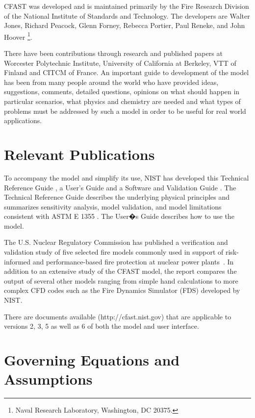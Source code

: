 CFAST was developed and is maintained primarily by the Fire Research Division of the National Institute of Standards and Technology. The developers are Walter Jones, Richard Peacock, Glenn Forney, Rebecca Portier, Paul Reneke, and John Hoover \footnote{Naval Research Laboratory, Washington, DC 20375.}.

There have been contributions through research and published papers at Worcester Polytechnic Institute, University of California at Berkeley, VTT of Finland and CITCM of France. An important guide to development of the model has been from many people around the world who have provided ideas, suggestions, comments, detailed questions, opinions on what should happen in particular scenarios, what physics and chemistry are needed and what types of problems must be addressed by such a model in order to be useful for real world applications.

\section{Relevant Publications}

To accompany the model and simplify its use, NIST has developed this Technical Reference Guide \cite{CFAST_Tech_Guide_6}, a User's Guide \cite{CFAST_Users_Guide_6} and a Software and Validation Guide \cite{CFAST_Valid_Guide_6}.  The Technical Reference Guide describes the underlying physical principles and summarizes sensitivity analysis, model validation, and model limitations consistent with ASTM E 1355 \cite{ASTM:E1355}.  The User�s Guide describes how to use the model.

The U.S. Nuclear Regulatory Commission has published a verification and validation study of five selected fire models commonly used in support of risk-informed and performance-based fire protection at nuclear power plants~\cite{NRCNUREG1824}. In addition to an extensive study of the CFAST model, the report compares the output of several other models ranging from simple hand calculations to more complex CFD codes such as the Fire Dynamics Simulator (FDS) developed by NIST.

There are documents available (http://cfast.nist.gov) that are applicable to versions 2, 3, 5 as well as 6 of both the model and user interface.

\section{Governing Equations and Assumptions}

